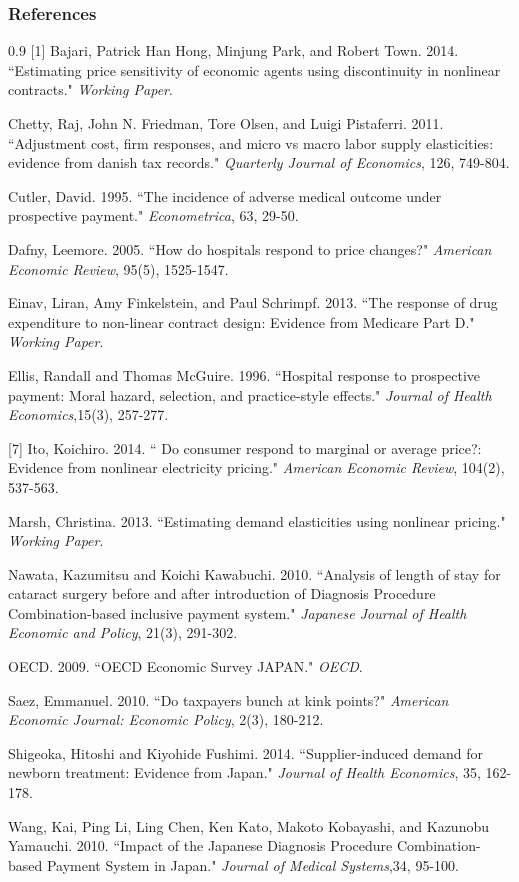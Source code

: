 \documentclass[14pt]{beamer}
\begin{document}
\begin{frame}[allowframebreaks]
\frametitle{References}
\footnotesize
\begin{spacing}{0.9}
[1] Bajari, Patrick Han Hong, Minjung Park, and Robert Town. 2014. ``Estimating price sensitivity of economic agents using discontinuity in nonlinear contracts." {\it Working Paper}.\par
[2] Chetty, Raj, John N. Friedman, Tore Olsen, and Luigi Pistaferri. 2011. ``Adjustment cost, firm responses, and micro vs macro labor supply elasticities: evidence from danish tax records." {\it Quarterly Journal of Economics}, 126, 749-804.\par
[3] Cutler, David. 1995. ``The incidence of adverse medical outcome under prospective payment." {\it Econometrica}, 63, 29-50.\par
[4] Dafny, Leemore. 2005. ``How do hospitals respond to price changes?" {\it American Economic Review}, 95(5), 1525-1547.\par
[5] Einav, Liran, Amy Finkelstein, and Paul Schrimpf. 2013. ``The response of drug expenditure to non-linear contract design: Evidence from Medicare Part D." {\it Working Paper}.\par
[6] Ellis, Randall and Thomas McGuire. 1996. ``Hospital response to prospective payment: Moral hazard, selection, and practice-style effects." {\it Journal of Health Economics},15(3), 257-277.\par

\framebreak

[7] Ito, Koichiro. 2014. `` Do consumer respond to marginal or average price?: Evidence from nonlinear electricity pricing." {\it American Economic Review}, 104(2), 537-563.\par
[8] Marsh, Christina. 2013. ``Estimating demand elasticities using nonlinear pricing." {\it Working Paper}.\par
[9] Nawata, Kazumitsu and Koichi Kawabuchi. 2010. ``Analysis of length of stay for cataract surgery before and after introduction of Diagnosis Procedure Combination-based inclusive payment system." {\it Japanese Journal of Health Economic and Policy}, 21(3), 291-302.\par
[10] OECD. 2009. ``OECD Economic Survey JAPAN." {\it OECD}.\par
[11]Saez, Emmanuel. 2010. ``Do taxpayers bunch at kink points?" {\it American Economic Journal: Economic Policy}, 2(3), 180-212.\par
[12] Shigeoka, Hitoshi  and Kiyohide Fushimi. 2014. ``Supplier-induced demand for newborn treatment: Evidence from Japan." {\it Journal of Health Economics}, 35, 162-178.\par
[13] Wang, Kai, Ping Li, Ling Chen, Ken Kato, Makoto Kobayashi, and Kazunobu Yamauchi. 2010. ``Impact of the Japanese Diagnosis Procedure Combination-based Payment System in Japan." {\it Journal of Medical Systems},34, 95-100.
\end{spacing}
\end{frame}
\end{document}
